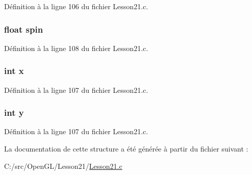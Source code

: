 Définition à la ligne 106 du fichier Lesson21.\+c.

\hypertarget{structobject_a62ab25ca0dac52cd5b575b88acbf69be}{}
\subsubsection[{spin}]{\setlength{\rightskip}{0pt plus 5cm}float spin}\label{structobject_a62ab25ca0dac52cd5b575b88acbf69be}


Définition à la ligne 108 du fichier Lesson21.\+c.

\hypertarget{structobject_a6150e0515f7202e2fb518f7206ed97dc}{}
\subsubsection[{x}]{\setlength{\rightskip}{0pt plus 5cm}int x}\label{structobject_a6150e0515f7202e2fb518f7206ed97dc}


Définition à la ligne 107 du fichier Lesson21.\+c.

\hypertarget{structobject_a0a2f84ed7838f07779ae24c5a9086d33}{}
\subsubsection[{y}]{\setlength{\rightskip}{0pt plus 5cm}int y}\label{structobject_a0a2f84ed7838f07779ae24c5a9086d33}


Définition à la ligne 107 du fichier Lesson21.\+c.



La documentation de cette structure a été générée à partir du fichier suivant \+:\begin{DoxyCompactItemize}
\item 
C\+:/src/\+Open\+G\+L/\+Lesson21/\hyperlink{_lesson21_8c}{Lesson21.\+c}\end{DoxyCompactItemize}
